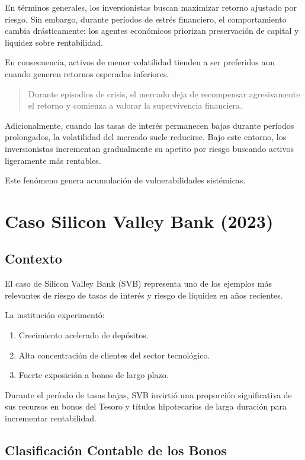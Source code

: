 En términos generales, los inversionistas buscan maximizar retorno ajustado por riesgo. Sin embargo, durante períodos de estrés financiero, el comportamiento cambia drásticamente: los agentes económicos priorizan preservación de capital y liquidez sobre rentabilidad.

En consecuencia, activos de menor volatilidad tienden a ser preferidos aun cuando generen retornos esperados inferiores.

\begin{quote}
Durante episodios de crisis, el mercado deja de recompensar agresivamente el retorno y comienza a valorar la supervivencia financiera.
\end{quote}

Adicionalmente, cuando las tasas de interés permanecen bajas durante períodos prolongados, la volatilidad del mercado suele reducirse. Bajo este entorno, los inversionistas incrementan gradualmente su apetito por riesgo buscando activos ligeramente más rentables.

Este fenómeno genera acumulación de vulnerabilidades sistémicas.

\section{Caso Silicon Valley Bank (2023)}

\subsection{Contexto}

El caso de Silicon Valley Bank (SVB) representa uno de los ejemplos más relevantes de riesgo de tasas de interés y riesgo de liquidez en años recientes.

La institución experimentó:

\begin{enumerate}
    \item Crecimiento acelerado de depósitos.
    \item Alta concentración de clientes del sector tecnológico.
    \item Fuerte exposición a bonos de largo plazo.
\end{enumerate}

Durante el período de tasas bajas, SVB invirtió una proporción significativa de sus recursos en bonos del Tesoro y títulos hipotecarios de larga duración para incrementar rentabilidad.

\subsection{Clasificación Contable de los Bonos}

